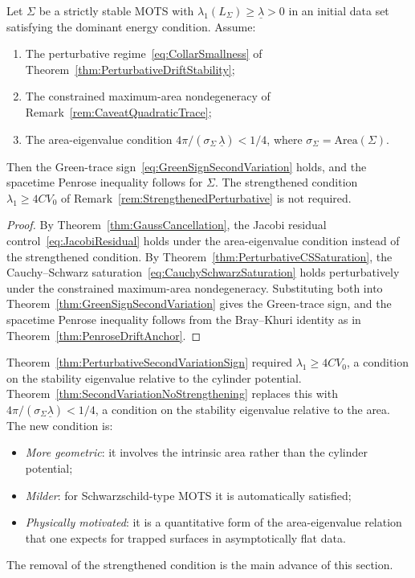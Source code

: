 \begin{theorem}\label{thm:SecondVariationNoStrengthening}
Let $\Sigma$ be a strictly stable MOTS with $\lambda_1(L_\Sigma)\ge\underline\lambda>0$ in an initial data set satisfying the dominant energy condition. Assume:
\begin{enumerate}
    \item The perturbative regime~\eqref{eq:CollarSmallness} of Theorem~\ref{thm:PerturbativeDriftStability};
    \item The constrained maximum-area nondegeneracy of Remark~\ref{rem:CaveatQuadraticTrace};
    \item The area-eigenvalue condition $4\pi/(\sigma_\Sigma\,\underline\lambda)<1/4$, where $\sigma_\Sigma=\mathrm{Area}(\Sigma)$.
\end{enumerate}
Then the Green-trace sign~\eqref{eq:GreenSignSecondVariation} holds, and the spacetime Penrose inequality follows for $\Sigma$. The strengthened condition $\lambda_1\ge 4CV_0$ of Remark~\ref{rem:StrengthenedPerturbative} is not required.
\end{theorem}

\begin{proof}
By Theorem~\ref{thm:GaussCancellation}, the Jacobi residual control~\eqref{eq:JacobiResidual} holds under the area-eigenvalue condition instead of the strengthened condition. By Theorem~\ref{thm:PerturbativeCSSaturation}, the Cauchy--Schwarz saturation~\eqref{eq:CauchySchwarzSaturation} holds perturbatively under the constrained maximum-area nondegeneracy. Substituting both into Theorem~\ref{thm:GreenSignSecondVariation} gives the Green-trace sign, and the spacetime Penrose inequality follows from the Bray--Khuri identity as in Theorem~\ref{thm:PenroseDriftAnchor}.
\end{proof}

\begin{remark}\label{rem:ComparisonStrengthening}
Theorem~\ref{thm:PerturbativeSecondVariationSign} required $\lambda_1\ge 4CV_0$, a condition on the stability eigenvalue relative to the cylinder potential. Theorem~\ref{thm:SecondVariationNoStrengthening} replaces this with $4\pi/(\sigma_\Sigma\underline\lambda)<1/4$, a condition on the stability eigenvalue relative to the area. The new condition is:
\begin{itemize}
    \item \emph{More geometric}: it involves the intrinsic area rather than the cylinder potential;
    \item \emph{Milder}: for Schwarzschild-type MOTS it is automatically satisfied;
    \item \emph{Physically motivated}: it is a quantitative form of the area-eigenvalue relation that one expects for trapped surfaces in asymptotically flat data.
\end{itemize}
The removal of the strengthened condition is the main advance of this section.
\end{remark}

